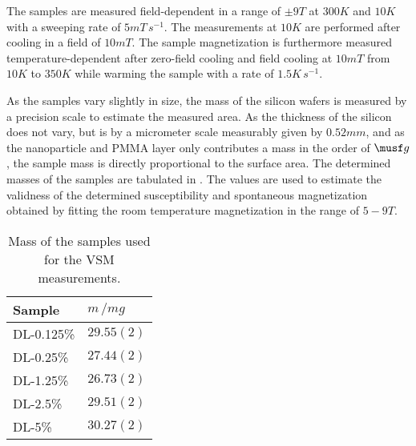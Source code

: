 \documentclass[\main/dresen_thesis.tex]{subfiles}
\begin{document}
    The samples are measured field-dependent in a range of $\pm 9 \unit{T}$ at $300 \unit{K}$ and $10 \unit{K}$ with a sweeping rate of $5 \unit{mT \, s^{-1}}$.
    The measurements at $10 \unit{K}$ are performed after cooling in a field of $10 \unit{mT}$.
    The sample magnetization is furthermore measured temperature-dependent after zero-field cooling and field cooling at $10 \unit{mT}$ from $10 \unit{K}$ to $350 \unit{K}$ while warming the sample with a rate of $1.5 \unit{K \, s^{-1}}$.

    As the samples vary slightly in size, the mass of the silicon wafers is measured by a precision scale to estimate the measured area. As the thickness of the silicon does not vary, but is by a micrometer scale measurably given by $0.52 \unit{mm}$, and as the nanoparticle and PMMA layer only contributes a mass in the order of $\musf g$, the sample mass is directly proportional to the surface area.
    The determined masses of the samples are tabulated in .
    The values are used to estimate the validness of the determined susceptibility and spontaneous magnetization obtained by fitting the room temperature magnetization in the range of $5 - 9 \unit{T}$.

    \begin{table}[!htbp]
      \centering
      \caption{\label{tab:doubleLayers:layerCharacterization:ppmsMasses}Mass of the samples used for the VSM measurements.}
      \begin{tabular}{ l | l}
        \rule{0pt}{2ex} \textbf{Sample}  & $m \, / \unit{mg}$ \\
        \hline
        \rule{0pt}{2ex} DL-0.125\%   & $29.55(2)$ \\
        \rule{0pt}{2ex} DL-0.25\%    & $27.44(2)$ \\
        \rule{0pt}{2ex} DL-1.25\%    & $26.73(2)$ \\
        \rule{0pt}{2ex} DL-2.5\%     & $29.51(2)$ \\
        \rule{0pt}{2ex} DL-5\%       & $30.27(2)$ \\
        \hline
      \end{tabular}
    \end{table}
\end{document}
